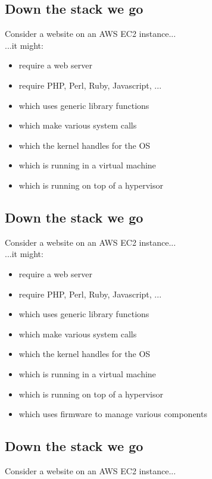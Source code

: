 \documentclass[xga]{xdvislides}
\begin{document}
\subsection{Down the stack we go}
Consider a website on an AWS EC2 instance...
\\

...it might:

\begin{itemize}
	\item require a web server
	\item require PHP, Perl, Ruby, Javascript, ...
	\item which uses generic library functions
	\item which make various system calls
	\item which the kernel handles for the OS
	\item which is running in a virtual machine
	\item which is running on top of a hypervisor
\end{itemize}

\subsection{Down the stack we go}
Consider a website on an AWS EC2 instance...
\\

...it might:

\begin{itemize}
	\item require a web server
	\item require PHP, Perl, Ruby, Javascript, ...
	\item which uses generic library functions
	\item which make various system calls
	\item which the kernel handles for the OS
	\item which is running in a virtual machine
	\item which is running on top of a hypervisor
	\item which uses firmware to manage various components
\end{itemize}

\subsection{Down the stack we go}
Consider a website on an AWS EC2 instance...
\\
\end{document}

